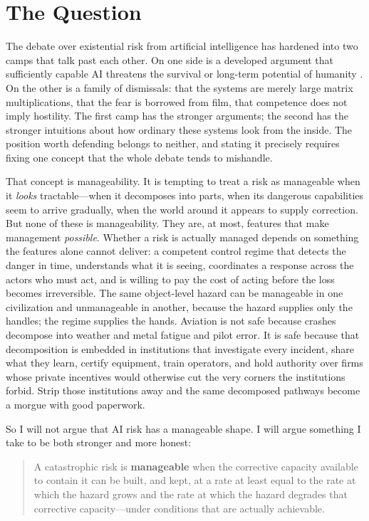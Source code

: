\documentclass[11pt]{article}
\begin{document}
\section{The Question}
\label{sec:question}

The debate over existential risk from artificial intelligence has hardened into two camps that talk past each other. On one side is a developed argument that sufficiently capable AI threatens the survival or long-term potential of humanity \citep{bostrom2014, yudkowsky2008, ord2020, carlsmith2022}. On the other is a family of dismissals: that the systems are merely large matrix multiplications, that the fear is borrowed from film, that competence does not imply hostility. The first camp has the stronger arguments; the second has the stronger intuitions about how ordinary these systems look from the inside. The position worth defending belongs to neither, and stating it precisely requires fixing one concept that the whole debate tends to mishandle.

That concept is manageability. It is tempting to treat a risk as manageable when it \emph{looks} tractable---when it decomposes into parts, when its dangerous capabilities seem to arrive gradually, when the world around it appears to supply correction. But none of these is manageability. They are, at most, features that make management \emph{possible}. Whether a risk is actually managed depends on something the features alone cannot deliver: a competent control regime that detects the danger in time, understands what it is seeing, coordinates a response across the actors who must act, and is willing to pay the cost of acting before the loss becomes irreversible. The same object-level hazard can be manageable in one civilization and unmanageable in another, because the hazard supplies only the handles; the regime supplies the hands. Aviation is not safe because crashes decompose into weather and metal fatigue and pilot error. It is safe because that decomposition is embedded in institutions that investigate every incident, share what they learn, certify equipment, train operators, and hold authority over firms whose private incentives would otherwise cut the very corners the institutions forbid. Strip those institutions away and the same decomposed pathways become a morgue with good paperwork.

So I will not argue that AI risk has a manageable shape. I will argue something I take to be both stronger and more honest:

\begin{quote}
A catastrophic risk is \textbf{manageable} when the corrective capacity available to contain it can be built, and kept, at a rate at least equal to the rate at which the hazard grows and the rate at which the hazard degrades that corrective capacity---under conditions that are actually achievable.
\end{quote}
\end{document}
